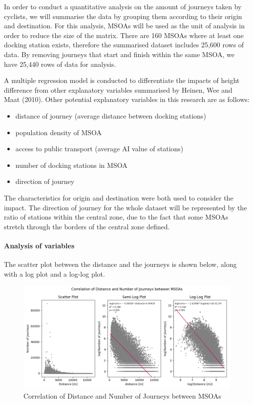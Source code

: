 \documentclass[
  a4paper,
  DIV=11,
  numbers=noendperiod]{scrartcl}
\let\oldparagraph\paragraph
\renewcommand{\paragraph}[1]{\oldparagraph{#1}\mbox{}}
\providecommand{\tightlist}{%
  \setlength{\itemsep}{0pt}\setlength{\parskip}{0pt}}\usepackage{longtable,booktabs,array}
\begin{document}
In order to conduct a quantitative analysis on the amount of journeys
taken by cyclists, we will summarise the data by grouping them according
to their origin and destination. For this analysis, MSOAs will be used
as the unit of analysis in order to reduce the size of the matrix. There
are 160 MSOAs where at least one docking station exists, therefore the
summarised dataset includes 25,600 rows of data. By removing journeys
that start and finish within the same MSOA, we have 25,440 rows of data
for analysis.

A multiple regression model is conducted to differentiate the impacts of
height difference from other explanatory variables summarised by Heinen,
Wee and Maat (2010). Other potential explanatory variables in this
research are as follows:

\begin{itemize}
\tightlist
\item
  distance of journey (average distance between docking stations)
\item
  population density of MSOA
\item
  access to public transport (average AI value of stations)
\item
  number of docking stations in MSOA
\item
  direction of journey
\end{itemize}

The characteristics for origin and destination were both used to
consider the impact. The direction of journey for the whole dataset will
be represented by the ratio of stations within the central zone, due to
the fact that some MSOAs stretch through the borders of the central zone
defined.

\hypertarget{analysis-of-variables}{%
\paragraph{Analysis of variables}\label{analysis-of-variables}}

The scatter plot between the distance and the journeys is shown below,
along with a log plot and a log-log plot.

\begin{figure}

{\centering \includegraphics{img/scatter_MSOA.png}

}

\caption{Correlation of Distance and Number of Journeys between MSOAs}

\end{figure}
\end{document}
